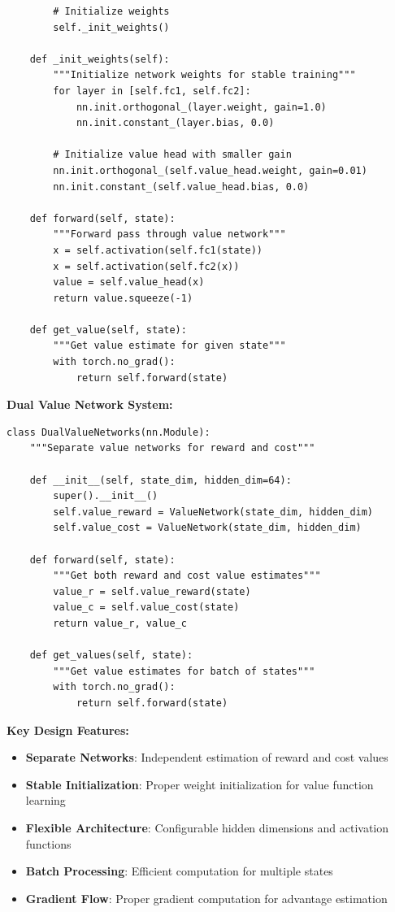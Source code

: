 \documentclass[12pt]{article}
\begin{document}
{{{{\begin{verbatim}
        # Initialize weights
        self._init_weights()
    
    def _init_weights(self):
        """Initialize network weights for stable training"""
        for layer in [self.fc1, self.fc2]:
            nn.init.orthogonal_(layer.weight, gain=1.0)
            nn.init.constant_(layer.bias, 0.0)
        
        # Initialize value head with smaller gain
        nn.init.orthogonal_(self.value_head.weight, gain=0.01)
        nn.init.constant_(self.value_head.bias, 0.0)
    
    def forward(self, state):
        """Forward pass through value network"""
        x = self.activation(self.fc1(state))
        x = self.activation(self.fc2(x))
        value = self.value_head(x)
        return value.squeeze(-1)
    
    def get_value(self, state):
        """Get value estimate for given state"""
        with torch.no_grad():
            return self.forward(state)
\end{verbatim}

\textbf{Dual Value Network System:}
\begin{verbatim}
class DualValueNetworks(nn.Module):
    """Separate value networks for reward and cost"""
    
    def __init__(self, state_dim, hidden_dim=64):
        super().__init__()
        self.value_reward = ValueNetwork(state_dim, hidden_dim)
        self.value_cost = ValueNetwork(state_dim, hidden_dim)
    
    def forward(self, state):
        """Get both reward and cost value estimates"""
        value_r = self.value_reward(state)
        value_c = self.value_cost(state)
        return value_r, value_c
    
    def get_values(self, state):
        """Get value estimates for batch of states"""
        with torch.no_grad():
            return self.forward(state)
\end{verbatim}

\textbf{Key Design Features:}
\begin{itemize}
\item \textbf{Separate Networks}: Independent estimation of reward and cost values
\item \textbf{Stable Initialization}: Proper weight initialization for value function learning
\item \textbf{Flexible Architecture}: Configurable hidden dimensions and activation functions
\item \textbf{Batch Processing}: Efficient computation for multiple states
\item \textbf{Gradient Flow}: Proper gradient computation for advantage estimation
\end{itemize}

}}}}
\end{document}
